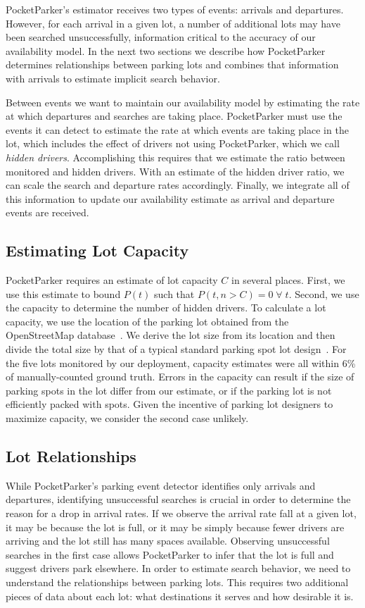 PocketParker's estimator receives two types of events: arrivals and
departures. However, for each arrival in a given lot, a number of additional
lots may have been searched unsuccessfully, information critical to the
accuracy of our availability model. In the next two sections we describe how
PocketParker determines relationships between parking lots and combines that
information with arrivals to estimate implicit search behavior.

Between events we want to maintain our availability model by estimating the
rate at which departures and searches are taking place. PocketParker must use
the events it can detect to estimate the rate at which events are taking
place in the lot, which includes the effect of drivers not using
PocketParker, which we call \textit{hidden drivers}. Accomplishing this
requires that we estimate the ratio between monitored and hidden drivers.
With an estimate of the hidden driver ratio, we can scale the search and
departure rates accordingly. Finally, we integrate all of this information to
update our availability estimate as arrival and departure events are
received.

\subsection{Estimating Lot Capacity}

PocketParker requires an estimate of lot capacity $C$ in several places.
First, we use this estimate to bound $P(t)$ such that $P(t, n > C) =
0\;\forall\;t$. Second, we use the capacity to determine the number of hidden
drivers. To calculate a lot capacity, we use the location of the parking lot
obtained from the OpenStreetMap database~\cite{openstreetmap}. We derive the
lot size from its location and then divide the total size by that of a
typical standard parking spot lot design~\cite{parkingdesign}. For the five
lots monitored by our deployment, capacity estimates were all within 6\% of
manually-counted ground truth. Errors in the capacity can result if the size
of parking spots in the lot differ from our estimate, or if the parking lot
is not efficiently packed with spots. Given the incentive of parking lot
designers to maximize capacity, we consider the second case unlikely.

\subsection{Lot Relationships}

While PocketParker's parking event detector identifies only arrivals and
departures, identifying unsuccessful searches is crucial in order to
determine the reason for a drop in arrival rates. If we observe the arrival
rate fall at a given lot, it may be because the lot is full, or it may be
simply because fewer drivers are arriving and the lot still has many spaces
available. Observing unsuccessful searches in the first case allows
PocketParker to infer that the lot is full and suggest drivers park
elsewhere. In order to estimate search behavior, we need to understand the
relationships between parking lots. This requires two additional pieces of
data about each lot: what destinations it serves and how desirable it is.

